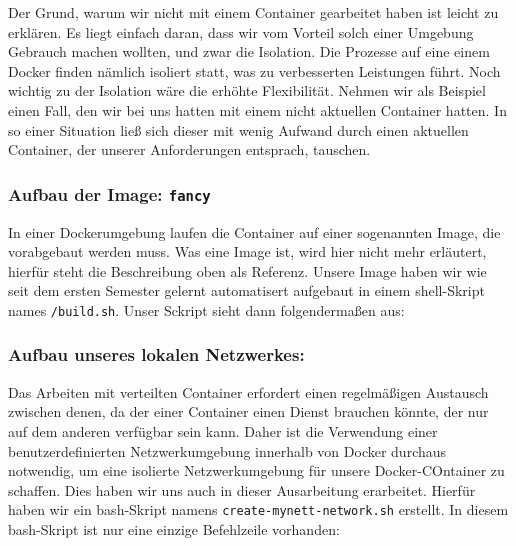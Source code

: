 Der Grund, warum wir nicht mit einem Container gearbeitet haben ist leicht zu erklären. Es liegt einfach daran, dass wir vom Vorteil solch einer Umgebung Gebrauch machen wollten, und zwar die Isolation. Die Prozesse auf eine einem Docker finden nämlich isoliert statt, was zu verbesserten Leistungen führt. Noch wichtig zu der Isolation wäre die erhöhte Flexibilität. Nehmen wir als Beispiel einen Fall, den wir bei uns hatten mit einem nicht aktuellen Container hatten. In so einer Situation ließ sich dieser mit wenig Aufwand durch einen aktuellen Container, der unserer Anforderungen entsprach, tauschen.\\

\subsubsection{Aufbau der Image: \texttt{fancy}}

In einer Dockerumgebung laufen die Container auf einer sogenannten Image, die vorabgebaut werden muss. Was eine Image ist, wird hier nicht mehr erläutert, hierfür steht die Beschreibung oben als Referenz. Unsere Image haben wir wie seit dem ersten Semester gelernt automatisert aufgebaut in einem shell-Skript names \texttt{/build.sh}. Unser Sckript sieht dann folgendermaßen aus:

\subsubsection{Aufbau unseres lokalen Netzwerkes: }

Das Arbeiten mit verteilten Container erfordert einen regelmäßigen Austausch zwischen denen, da der einer Container einen Dienst brauchen könnte, der nur auf dem anderen verfügbar sein kann. Daher ist die Verwendung einer benutzerdefinierten Netzwerkumgebung innerhalb von Docker  durchaus notwendig, um eine isolierte Netzwerkumgebung für unsere Docker-COntainer zu schaffen. Dies haben wir uns auch in dieser Ausarbeitung erarbeitet. Hierfür haben wir ein bash-Skript namens \texttt{create-mynett-network.sh} erstellt. In diesem bash-Skript ist nur eine einzige Befehlzeile vorhanden:


